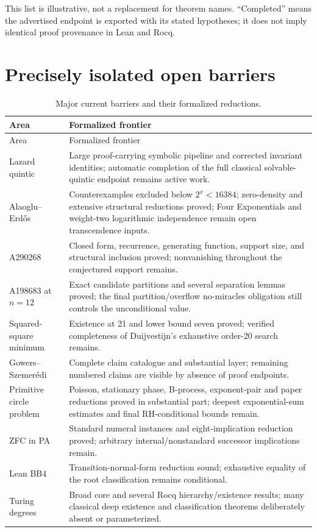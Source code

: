 \documentclass[
  10pt,
  a4paper,
  twoside,
  open=any,
  parskip=half,
  headings=big
]{scrreprt}
\newcommand{\code}[1]{\texttt{\detokenize{#1}}}
\begin{document}
This list is illustrative, not a replacement for theorem names. ``Completed'' means the advertised endpoint is exported with its stated hypotheses; it does not imply identical proof provenance in Lean and Rocq.

\section{Precisely isolated open barriers}

\begin{longtable}{@{}L{38mm}L{115mm}@{}}
\caption{Major current barriers and their formalized reductions.}\label{tab:frontiers}\\
\toprule
Area & Formalized frontier \\
\midrule
\endfirsthead
\toprule
Area & Formalized frontier \\
\midrule
\endhead
\bottomrule
\endfoot
Lazard quintic & Large proof-carrying symbolic pipeline and corrected invariant identities; automatic completion of the full classical solvable-quintic endpoint remains active work. \\
Alaoglu--Erd\H{o}s & Counterexamples excluded below $2^x<16384$; zero-density and extensive structural reductions proved; Four Exponentials and weight-two logarithmic independence remain open transcendence inputs. \\
A290268 & Closed form, recurrence, generating function, support size, and structural inclusion proved; nonvanishing throughout the conjectured support remains. \\
A198683 at $n=12$ & Exact candidate partitions and several separation lemmas proved; the final partition/overflow no-miracles obligation still controls the unconditional value. \\
Squared-square minimum & Existence at 21 and lower bound seven proved; verified completeness of Duijvestijn's exhaustive order-20 search remains. \\
Gowers--Szemer\'edi & Complete claim catalogue and substantial \code{_holds} layer; remaining numbered claims are visible by absence of proof endpoints. \\
Primitive circle problem & Poisson, stationary phase, B-process, exponent-pair and paper reductions proved in substantial part; deepest exponential-sum estimates and final RH-conditional bounds remain. \\
ZFC in PA & Standard numeral instances and eight-implication reduction proved; arbitrary internal/nonstandard successor implications remain. \\
Lean BB4 & Transition-normal-form reduction sound; exhaustive equality of the root classification remains conditional. \\
Turing degrees & Broad core and several Rocq hierarchy/existence results; many classical deep existence and classification theorems deliberately absent or parameterized. \\
\end{longtable}
\end{document}
